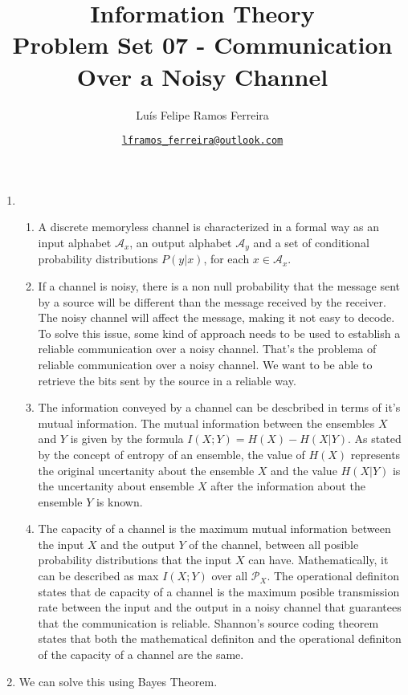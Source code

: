 \documentclass{article}
\title{Information Theory \\ \large Problem Set 07 - Communication Over a Noisy Channel}
\author{Luís Felipe Ramos Ferreira}
\date{\href{mailto:lframos\_ferreira@outlook.com}{\texttt{lframos\_ferreira@outlook.com}}
}
\begin{document}
\maketitle

\begin{enumerate}
	\item  \begin{enumerate}
		      \item A discrete memoryless channel is characterized in a formal way as an input alphabet \(\mathcal{A}_x\), an output alphabet \(\mathcal{A}_y\) and a set of conditional probability distributions \(P(y | x)\), for each \(x \in \mathcal{A}_x\).
		      \item If a channel is noisy, there is a non null probability that the message sent by a source will be different than the message received by the receiver. The noisy channel will affect the message, making it not easy to decode. To solve this issue, some kind of approach needs to be used to establish a reliable communication over a noisy channel. That's the problema of reliable communication over a noisy channel. We want to be able
		            to retrieve the bits sent by the source in a reliable way.
		      \item The information conveyed by a channel can be descbribed in terms of it's mutual information. The mutual information between the ensembles \(X\) and \(Y\) is given by the formula \(I(X; Y) = H(X) - H(X | Y)\). As stated by the concept of entropy of an ensemble, the value of
		            \(H(X)\) represents the original uncertanity about the ensemble \(X\) and the value \(H(X | Y)\) is the uncertanity about ensemble \(X\) after the information about the ensemble \(Y\) is known.
		      \item The capacity of a channel is the maximum mutual information between the input \(X\) and the output \(Y\) of the channel, between all posible probability distributions that the input \(X\) can have. Mathematically, it can be described as
		            max \(I(X; Y)\) over all \(\mathcal{P}_X\). The operational definiton states that de capacity of a channel is the maximum posible transmission rate between the input and the output in a noisy channel that guarantees that the communication is reliable.
		            Shannon's source coding theorem states that both the mathematical definiton and the operational definiton of the capacity of a channel are the same.
	      \end{enumerate}
	\item We can solve this using Bayes Theorem.

\end{enumerate}
\end{document}
